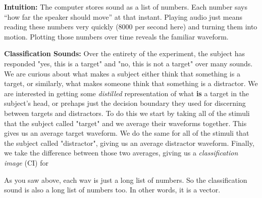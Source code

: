 \documentclass[11pt]{article}
\begin{document}
\noindent
\textbf{Intuition:} The computer stores sound as a list of numbers. Each number says 
“how far the speaker should move” at that instant. Playing audio just means reading 
these numbers very quickly (8000 per second here) and turning them into motion. 
Plotting those numbers over time reveals the familiar waveform.

\textbf{Classification Sounds:} Over the entirety of the experiment, the subject has responded "yes, this is a target" and "no, this is not a target" over many sounds. 
We are curious about what makes a subject either think that something is a target, or similarly, what makes someone think that something is a distractor.
We are interested in getting some \textit{distilled} representation of what \textbf{is} a target in the subject's head, or prehaps just the decision boundary they used for discerning between targets and distractors.
To do this we start by taking all of the stimuli that the subject called "target" and we average their waveforms together. This gives us an average target waveform. We do the same for all of the stimuli that the subject called "distractor", giving us an average distractor waveform. Finally, we take the difference between those two averages, giving us a \textit{classification image} (CI) for 

As you saw above, each wav is just a long list of numbers. So the classification sound is also a long list of numbers too. In other words, it is a vector.
\end{document}

